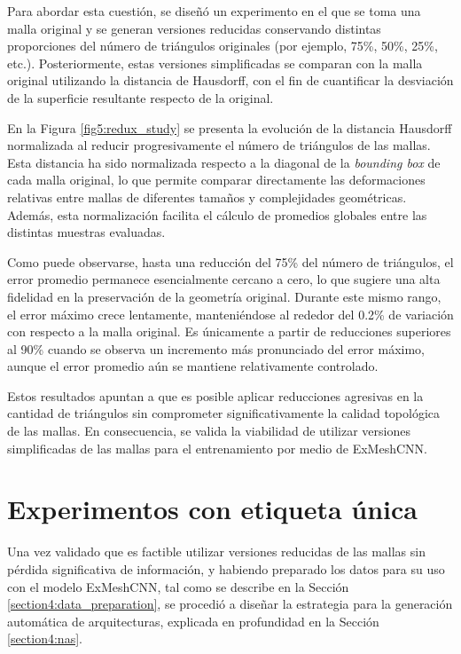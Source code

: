 Para abordar esta cuestión, se diseñó un experimento en el que se toma una malla original y se generan versiones reducidas conservando distintas proporciones del número de triángulos originales (por ejemplo, 75\%, 50\%, 25\%, etc.). Posteriormente, estas versiones simplificadas se comparan con la malla original utilizando la distancia de Hausdorff, con el fin de cuantificar la desviación de la superficie resultante respecto de la original.

En la Figura \ref{fig5:redux_study} se presenta la evolución de la distancia Hausdorff normalizada al reducir progresivamente el número de triángulos de las mallas. Esta distancia ha sido normalizada respecto a la diagonal de la \textit{bounding box} de cada malla original, lo que permite comparar directamente las deformaciones relativas entre mallas de diferentes tamaños y complejidades geométricas. Además, esta normalización facilita el cálculo de promedios globales entre las distintas muestras evaluadas.

Como puede observarse, hasta una reducción del 75\% del número de triángulos, el error promedio permanece esencialmente cercano a cero, lo que sugiere una alta fidelidad en la preservación de la geometría original. Durante este mismo rango, el error máximo crece lentamente, manteniéndose al rededor del 0.2\% de variación con respecto a la malla original. Es únicamente a partir de reducciones superiores al 90\% cuando se observa un incremento más pronunciado del error máximo, aunque el error promedio aún se mantiene relativamente controlado.

Estos resultados apuntan a que es posible aplicar reducciones agresivas en la cantidad de triángulos sin comprometer significativamente la calidad topológica de las mallas. En consecuencia, se valida la viabilidad de utilizar versiones simplificadas de las mallas para el entrenamiento por medio de ExMeshCNN.

\section{Experimentos con etiqueta única}
Una vez validado que es factible utilizar versiones reducidas de las mallas sin pérdida significativa de información, y habiendo preparado los datos para su uso con el modelo ExMeshCNN, tal como se describe en la Sección \ref{section4:data_preparation}, se procedió a diseñar la estrategia para la generación automática de arquitecturas, explicada en profundidad en la Sección \ref{section4:nas}.

